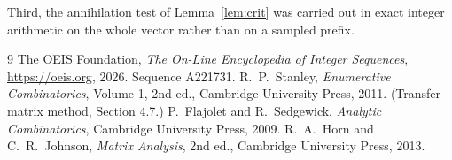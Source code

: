 \documentclass[11pt,a4paper]{article}
\theoremstyle{plain}
\theoremstyle{definition}
\begin{document}
Third, the annihilation test of Lemma~\ref{lem:crit} was carried out in exact integer
arithmetic on the whole vector rather than on a sampled prefix.

\begin{thebibliography}{9}
 The OEIS Foundation, \emph{The On-Line Encyclopedia of Integer
Sequences}, \url{https://oeis.org}, 2026. Sequence A221731.
 R.~P.~Stanley, \emph{Enumerative Combinatorics}, Volume 1, 2nd ed.,
Cambridge University Press, 2011. (Transfer-matrix method, Section 4.7.)
 P.~Flajolet and R.~Sedgewick, \emph{Analytic Combinatorics}, Cambridge
University Press, 2009.
 R.~A.~Horn and C.~R.~Johnson, \emph{Matrix Analysis}, 2nd ed., Cambridge
University Press, 2013.
\end{thebibliography}
\end{document}
